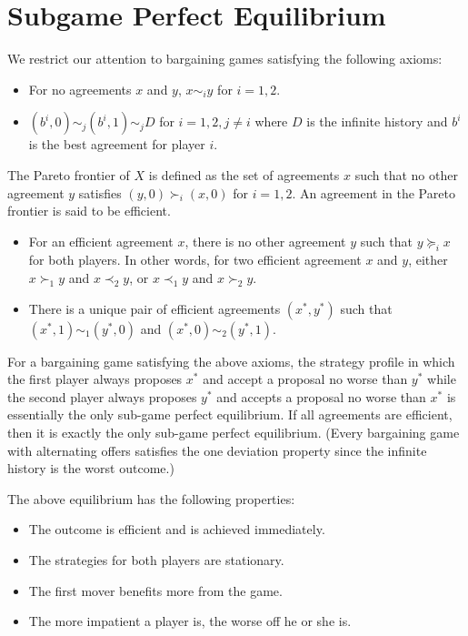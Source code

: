 \documentclass[openany]{book}
\begin{document}
\section{Subgame Perfect Equilibrium}
We restrict our attention to bargaining games satisfying the following axioms:
\begin{itemize}
\item For no agreements $x$ and $y$, $x\sim_iy$ for $i=1,2$.
\item $(b^i,0)\sim_j(b^i,1)\sim_jD$ for $i=1,2,j\ne i$ where $D$ is the infinite history and $b^i$ is the best agreement for player $i$.
\end{itemize}
The Pareto frontier of $X$ is defined as the set of agreements $x$ such that no other agreement $y$ satisfies $(y,0)\succ_i(x,0)$ for $i=1,2$. An agreement in the Pareto frontier is said to be efficient.
\begin{itemize}
\item For an efficient agreement $x$, there is no other agreement $y$ such that $y\succeq_ix$ for both players. In other words, for two efficient agreement $x$ and $y$, either $x\succ_1y$ and $x\prec_2y$, or $x\prec_1y$ and $x\succ_2y$.
\item There is a unique pair of efficient agreements $(x^*,y^*)$ such that $(x^*,1)\sim_1(y^*,0)$ and $(x^*,0)\sim_2(y^*,1)$.
\end{itemize}

For a bargaining game satisfying the above axioms, the strategy profile in which the first player always proposes $x^*$ and accept a proposal no worse than $y^*$ while the second player always proposes $y^*$ and accepts a proposal no worse than $x^*$ is essentially the only sub-game perfect equilibrium. If all agreements are efficient, then it is exactly the only sub-game perfect equilibrium. (Every bargaining game with alternating offers satisfies the one deviation property since the infinite history is the worst outcome.)

The above equilibrium has the following properties:
\begin{itemize}
\item The outcome is efficient and is achieved immediately.
\item The strategies for both players are stationary.
\item The first mover benefits more from the game.
\item The more impatient a player is, the worse off he or she is.
\end{itemize}
\end{document}

